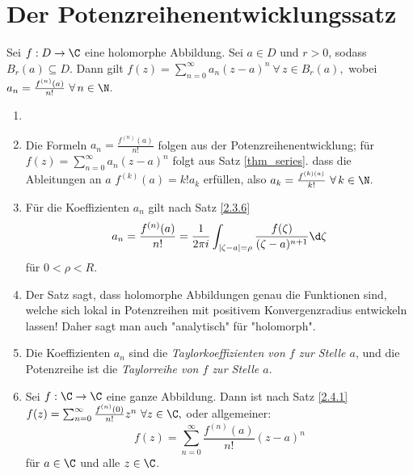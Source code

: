 \section{Der Potenzreihenentwicklungssatz}\lecture
		
		\begin{thm}\label{2.4.1}
			Sei $ f: D \to \C $ eine holomorphe Abbildung. Sei $ a \in D $ und $r>0$, sodass $ B_r(a) \subseteq D $. Dann gilt $ f(z) = \sum_{n=0}^\infty a_n(z-a)^n\ \forall \, z \in B_r(a), $ wobei $ a_n = \frac{f^{(n)}(a)}{n!}\ \forall\, n \in \N. $
		\end{thm}
		
		\begin{rem}
			\begin{enumerate}
				\item[]
				\item Die Formeln $ a_n = \frac{f^{(n)}(a)}{n!} $ folgen aus der Potenzreihenentwicklung; für $ f(z) = \sum_{n=0}^\infty a_n(z-a)^n $ folgt aus Satz \ref{thm_series}. dass die Ableitungen an $a$ $ f^{(k)}(a) = k!a_k $ erfüllen, also $ a_k = \frac{f^{(k)(a)}}{k!}\ \forall\, k \in \N. $
				\item Für die Koeffizienten $a_n$ gilt nach Satz \ref{2.3.6} 
				$$ a_n = \frac{f^{(n)}(a)}{n!} = \frac{1}{2 \pi i} \int_{|\zeta-a|=\rho} \frac{f(\zeta)}{(\zeta-a)^{n+1}} \d \zeta $$
				für $ 0 < \rho < R $.
				\item Der Satz sagt, dass holomorphe Abbildungen genau die Funktionen sind, welche sich lokal in Potenzreihen mit positivem Konvergenzradius entwickeln lassen! Daher sagt man auch "analytisch" für "holomorph".
				\item Die Koeffizienten $a_n$ sind die \emph{Taylorkoeffizienten von $f$ zur Stelle $a$}, und die Potenzreihe ist die \emph{Taylorreihe von $f$ zur Stelle $a$}.
				\item Sei $ f: \C \to \C $ eine ganze Abbildung. Dann ist nach Satz \ref{2.4.1} $ f(z) = \sum_{n=0}^\infty \frac{f^{(n)}(0)}{n!} z^n\ \forall z \in \C, $ oder allgemeiner:
				\[ f(z) = \sum_{n=0}^\infty \frac{f^{(n)}(a)}{n!} (z-a)^n \]
				für $a \in \C$ und alle $z \in \C$.
			\end{enumerate}
		\end{rem}